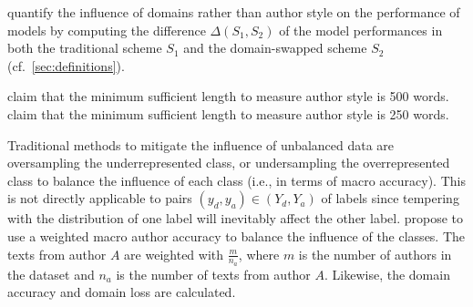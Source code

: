\citet{bischoff_importance_2020} quantify the influence of domains rather than author style on the performance of models by 
computing the difference $\Delta(S_1,S_2)$ of the model performances in both the traditional scheme $S_1$ 
and the domain-swapped scheme $S_2$ (cf.~\autoref{sec:definitions}).

\citet{bischoff_importance_2020} claim that the minimum sufficient length to measure author style is 500 words.
\citet{abbasi_writeprints_2008} claim that the minimum sufficient length to measure author style is 250 words.

Traditional methods to mitigate the influence of unbalanced data are oversampling the underrepresented class, 
or undersampling the overrepresented class to balance the influence of each class (i.e., in terms of macro accuracy).
This is not directly applicable to pairs $(y_d, y_a) \in (Y_d, Y_a)$ of labels since tempering with the distribution 
of one label will inevitably affect the other label.
\citet{bischoff_importance_2020} propose to use a weighted macro author accuracy to balance the influence of the classes.
The texts from author $A$ are weighted with $\frac{m}{n_a}$, 
where $m$ is the number of authors in the dataset and $n_a$ is the number of texts from author $A$.
Likewise, the domain accuracy and domain loss are calculated.